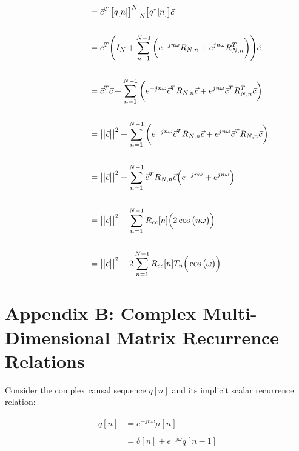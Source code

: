 \documentclass{article}
\begin{document}
\begin{align*}
    &\quad \quad \quad \quad \quad = \vec{c}^{T}\begin{bmatrix} q[n] \end{bmatrix}^{N}\prescript{}{N}{\begin{bmatrix} q^{*}[n] \end{bmatrix}}\vec{c} \\ \\
    &\quad \quad \quad \quad \quad = \vec{c}^{T}\Bigg(I_{N} + \sum_{n = 1}^{N - 1}\bigg( e^{-jn\omega}R_{N, n} + e^{ jn\omega}R_{N, n}^{T} \bigg)\Bigg)\vec{c} \\ \\
    &\quad \quad \quad \quad \quad = \vec{c}^{T}\vec{c} + \sum_{n = 1}^{N - 1}\bigg( e^{-jn\omega}\vec{c}^{T}R_{N, n}\vec{c} + e^{ jn\omega}\vec{c}^{T}R_{N, n}^{T}\vec{c} \bigg) \\ \\
    &\quad \quad \quad \quad \quad = \big|\big|\vec{c}\big|\big|^{2} + \sum_{n = 1}^{N - 1}\bigg( e^{-jn\omega}\vec{c}^{T}R_{N, n}\vec{c} + e^{ jn\omega}\vec{c}^{T}R_{N, n}\vec{c} \bigg) \\ \\
    &\quad \quad \quad \quad \quad = \big|\big|\vec{c}\big|\big|^{2} + \sum_{n = 1}^{N - 1}\vec{c}^{T}R_{N, n}\vec{c}\Big( e^{-jn\omega} + e^{ jn\omega} \Big) \\ \\
    &\quad \quad \quad \quad \quad = \big|\big|\vec{c}\big|\big|^{2} + \sum_{n = 1}^{N - 1}R_{cc}[n]\Big( 2\cos\big(n\omega\big) \Big) \\ \\
    &\quad \quad \quad \quad \quad = \big|\big|\vec{c}\big|\big|^{2} + 2\sum_{n = 1}^{N - 1}R_{cc}[n]T_{n}\Big(\cos\big(\omega\big)\Big)
  \end{align*}

\newpage
\section*{Appendix B: Complex Multi-Dimensional Matrix Recurrence Relations}

Consider the complex causal sequence $q[n]$ and its implicit scalar recurrence relation:

\begin{align*}
    q[n]&= e^{-jn\omega}\mu[n] \\ \\
        &= \delta[n] + e^{-j\omega}q[n - 1]
  \end{align*}\newline
\end{document}
